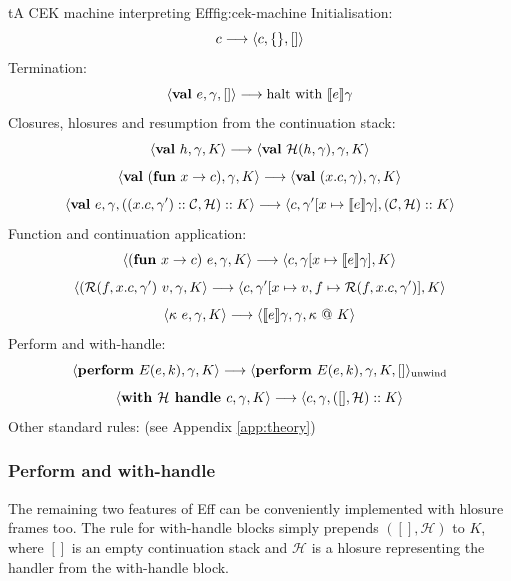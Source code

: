 \documentclass[class=article, crop=false]{standalone}
\begin{document}
\begin{myfigure}[0.9]{t}{A CEK machine interpreting Eff}{fig:cek-machine}
    Initialisation:
    $$ c \longrightarrow \langle c, \{\}, [] \rangle $$
    Termination:
    $$ \langle  \mathbf{val}\  e, \gamma, []  \rangle \longrightarrow \text{halt with } \llbracket e \rrbracket\gamma$$
    Closures, hlosures and resumption from the continuation stack:
    $$ \langle  \mathbf{val}\  h, \gamma, K \rangle \longrightarrow \langle \mathbf{val}\  \mathcal{H}(h, \gamma), \gamma, K \rangle $$
    $$ \langle  \mathbf{val}\  (\mathbf{fun}\  x \to c), \gamma, K \rangle \longrightarrow \langle \mathbf{val}\  (x.c, \gamma), \gamma, K  \rangle $$
    $$ \langle  \mathbf{val}\  e, \gamma, ((x.c, \gamma') :: \mathcal{C}, \mathcal{H}) :: K  \rangle \longrightarrow
        \langle c, \gamma'[x \mapsto \llbracket e \rrbracket\gamma], (\mathcal{C}, \mathcal{H}) :: K \rangle $$
    Function and continuation application:
    $$ \langle  (\mathbf{fun}\  x \to c)\ e, \gamma, K \rangle \longrightarrow \langle c, \gamma[x \mapsto \llbracket e \rrbracket\gamma], K  \rangle $$
    $$ \langle  (\mathcal{R}(f, x.c, \gamma')\ v, \gamma, K \rangle \longrightarrow \langle c, \gamma'[x \mapsto v, f \mapsto \mathcal{R}(f, x.c, \gamma')], K  \rangle $$
    $$ \langle \kappa\ e, \gamma, K  \rangle \longrightarrow \langle  \llbracket e \rrbracket \gamma, \gamma, \kappa\ @\ K  \rangle $$
    Perform and with-handle:
    $$ \langle  \mathbf{perform}\  E(e,k), \gamma, K  \rangle \longrightarrow \langle  \mathbf{perform}\  E(e,k), \gamma, K, []  \rangle_{\text{unwind}} $$
    $$ \langle  \textbf{with } \mathcal{H} \textbf{ handle } c, \gamma, K  \rangle \longrightarrow \langle  c, \gamma, ([], \mathcal{H}) :: K  \rangle $$
    Other standard rules: (see Appendix \ref{app:theory})
\end{myfigure}

\subsubsection{Perform and with-handle}

The remaining two features of Eff can be conveniently implemented with hlosure
frames too. The rule for with-handle blocks simply prepends $([], \mathcal{H})$
to $K$, where $[]$ is an empty continuation stack and $\mathcal{H}$ is a
hlosure representing the handler from the with-handle block.
\end{document}

